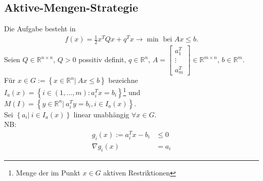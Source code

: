 \subsection{Aktive-Mengen-Strategie}
Die Aufgabe besteht in
\begin{align}
  f(x) = \frac12 x^TQx+q^Tx\rightarrow\min\text{ bei } Ax\le b.
\end{align}
Seien $Q\in\mathbb{R}^{n\times n}$, $Q>0$ possitiv definit, $q\in\mathbb{R}^n$, $A=\begin{bmatrix}a_1^T\\\vdots\\ a_m^T\end{bmatrix}\in\mathbb{R}^{m\times n}$, $b\in\mathbb{R}^m$.\\
Für $x\in G:=\left\{x\in\mathbb{R}^n|\ Ax\le b \right\}$ bezeichne $I_a(x)=\left\{i\in(1,\ldots,m):a_i^Tx=b_i\right\}$\footnote{Menge der im Punkt $x\in G$ aktiven Restriktionen} und
$M(I) = \left\{y\in\mathbb{R}^n|\ a_i^Ty=b_i, i\in I_a(x) \right\}$.\\
Sei $\left\{a_i|\ i\in I_a(x) \right\}$ linear unabhängig $\forall x\in G$.\\
\ac{NB}:
\begin{align*}
  g_i(x) := a_i^Tx -b_i & \le 0\\
  \nabla g_i(x) & = a_i
\end{align*}

